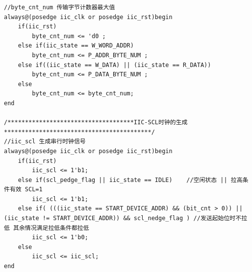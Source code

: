 \documentclass[a4paper,10pt]{article}
\begin{document}
\begin{lstlisting}[caption=iic_drive.v]
//byte_cnt_num 传输字节计数器最大值
always@(posedge iic_clk or posedge iic_rst)begin
    if(iic_rst)
        byte_cnt_num <= 'd0 ;    
    else if(iic_state == W_WORD_ADDR) 
        byte_cnt_num <= P_ADDR_BYTE_NUM ;
    else if((iic_state == W_DATA) || (iic_state == R_DATA))
        byte_cnt_num <= P_DATA_BYTE_NUM ;
    else 
        byte_cnt_num <= byte_cnt_num;
end

/************************************IIC-SCL时钟的生成******************************************/
//iic_scl 生成串行时钟信号 
always@(posedge iic_clk or posedge iic_rst)begin
    if(iic_rst)
        iic_scl <= 1'b1;                             
    else if(scl_pedge_flag || iic_state == IDLE)    //空闲状态 || 拉高条件有效 SCL=1
        iic_scl <= 1'b1;
    else if( (((iic_state == START_DEVICE_ADDR) && (bit_cnt > 0)) || (iic_state != START_DEVICE_ADDR)) && scl_nedge_flag ) //发送起始位时不拉低 其余情况满足拉低条件都拉低
        iic_scl <= 1'b0; 
    else 
        iic_scl <= iic_scl;
end


\end{lstlisting}
\end{document}
